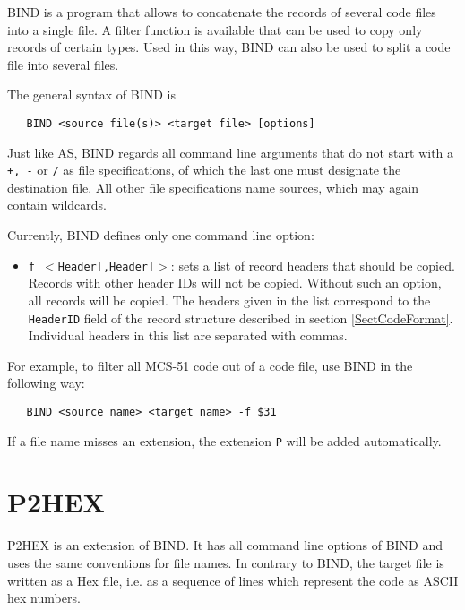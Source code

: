 \documentclass[12pt,twoside]{report}
\newcommand{\tty}[1]{{\tt #1}}
\begin{document}
BIND is a program that allows to concatenate the records of several
code files into a single file.  A filter function is available that
can be used to copy only records of certain types.  Used in this way,
BIND can also be used to split a code file into several files.

The general syntax of BIND is
\begin{verbatim}
   BIND <source file(s)> <target file> [options]
\end{verbatim}
Just like AS, BIND regards all command line arguments that do not
start with a \tty{+, -} or \tty{/} as file specifications, of which the last one
must designate the destination file.  All other file specifications
name sources, which may again contain wildcards.

Currently, BIND defines only one command line option:
\begin{itemize}
\item{\tty{f $<$Header[,Header]$>$}: sets a list of record headers that should
      be copied.  Records with other header IDs will
      not be copied.  Without such an option, all
      records will be copied.  The headers given in
      the list correspond to the \tty{HeaderID} field of the
      record structure described in section \ref{SectCodeFormat}. 
      Individual headers in this list are separated
      with commas.}
\end{itemize}
For example, to filter all MCS-51 code out of a code file, use BIND
in the following way:
\begin{verbatim}
   BIND <source name> <target name> -f $31
\end{verbatim}
If a file name misses an extension, the extension \tty{P} will be added
automatically.


\section{P2HEX}

P2HEX is an extension of BIND.  It has all command line options of BIND and
uses the same conventions for file names.  In contrary to BIND, the
target file is written as a Hex file, i.e. as a sequence of lines
which represent the code as ASCII hex numbers.
\end{document}
